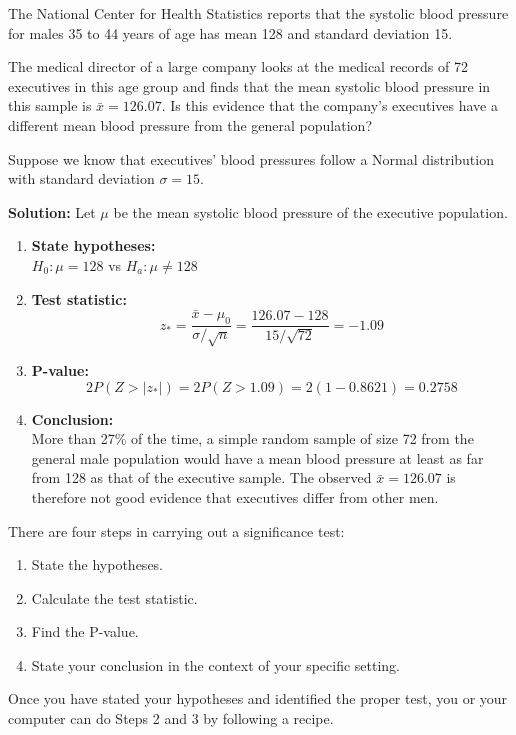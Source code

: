 \begin{example}

The National Center for Health Statistics reports that the systolic blood pressure for males 35 to 44 years of age has mean 128 and standard deviation 15. 

The medical director of a large company looks at the medical records of 72 executives in this age group and finds that the mean systolic blood pressure in this sample is $\bar{x} = 126.07$. Is this evidence that the company’s executives have a different mean blood pressure from the general population?

Suppose we know that executives’ blood pressures follow a Normal distribution with standard deviation $\sigma = 15$.

\textbf{Solution:} Let $\mu$ be the mean systolic blood pressure of the executive population.

\begin{enumerate}
    \item \textbf{State hypotheses:} \\
    $H_0: \mu = 128$ \hspace{1cm} vs \hspace{1cm} $H_a: \mu \ne 128$
    
    \item \textbf{Test statistic:} \\
    \[
    z_\ast = \frac{\bar{x} - \mu_0}{\sigma / \sqrt{n}} = \frac{126.07 - 128}{15 / \sqrt{72}} = -1.09
    \]

    \item \textbf{P-value:} \\
    \[
    2P(Z > |z_\ast|) = 2P(Z > 1.09) = 2(1 - 0.8621) = 0.2758
    \]

    \item \textbf{Conclusion:} \\
    More than 27\% of the time, a simple random sample of size 72 from the general male population would have a mean blood pressure at least as far from 128 as that of the executive sample. The observed $\bar{x} = 126.07$ is therefore not good evidence that executives differ from other men.
\end{enumerate}

\end{example}
\begin{tcolorbox}[title=\textbf{Tests for a Population Mean},
  colback=yellow!10,
  colframe=black!45,
  coltitle=black,
  fonttitle=\bfseries,
  breakable]

There are four steps in carrying out a significance test:
\begin{enumerate}
  \item State the hypotheses.
  \item Calculate the test statistic.
  \item Find the P-value.
  \item State your conclusion in the context of your specific setting.
\end{enumerate}

Once you have stated your hypotheses and identified the proper test, you or your computer can do Steps 2 and 3 by following a recipe. 

\end{tcolorbox}
